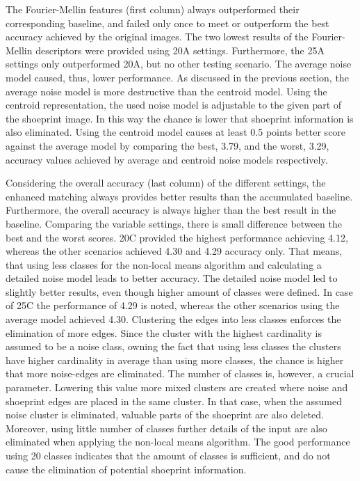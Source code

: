\documentclass[draft,final]{vutinfth} %
\begin{document}
\par
The Fourier-Mellin features (first column) always outperformed their corresponding baseline, and failed only once to meet or outperform the best accuracy achieved by the original images.
The two lowest results of the Fourier-Mellin descriptors were provided using 20A settings.
Furthermore, the 25A settings only outperformed 20A, but no other testing scenario.
The average noise model caused, thus, lower performance.
As discussed in the previous section, the average noise model is more destructive than the centroid model.
Using the centroid representation, the used noise model is adjustable to the given part of the shoeprint image.
In this way the chance is lower that shoeprint information is also eliminated. 
Using the centroid model causes at least 0.5 points better score against the average model by comparing the best, 3.79, and the worst, 3.29, accuracy values achieved by average and centroid noise models respectively.
\par
Considering the overall accuracy (last column) of the different settings, the enhanced matching always provides better results than the accumulated baseline.
Furthermore, the overall accuracy is always higher than the best result in the baseline.
Comparing the variable settings, there is small difference between the best and the worst scores.
20C provided the highest performance achieving 4.12, whereas the other scenarios achieved 4.30 and 4.29 accuracy only.
That means, that using less classes for the non-local means algorithm and calculating a detailed noise model leads to better accuracy.
The detailed noise model led to slightly better results, even though higher amount of classes were defined.
In case of 25C the performance of 4.29 is noted, whereas the other scenarios using the average model achieved 4.30.
Clustering the edges into less classes enforces the elimination of more edges.
Since the cluster with the highest cardinality is assumed to be a noise class,  owning the fact that using less classes the clusters have higher cardinality  in average than using more classes, the chance is higher that more noise-edges are eliminated.
The number of classes is, however, a crucial parameter.
Lowering this value more mixed clusters are created where noise and shoeprint edges are placed in the same cluster.
In that case, when the assumed noise cluster is eliminated, valuable parts of the shoeprint are also deleted.
Moreover, using little number of classes further details of the input are also eliminated when applying the non-local means algorithm.
The good performance using 20 classes indicates that the amount of classes is sufficient, and do not cause the elimination of potential shoeprint information.
\end{document}
